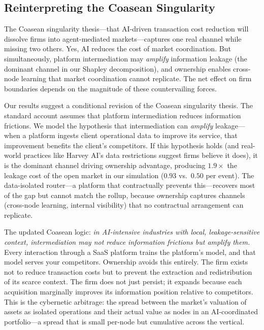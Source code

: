 \documentclass[12pt]{article}
\theoremstyle{definition}
\begin{document}
\subsection{Reinterpreting the Coasean Singularity}

The Coasean singularity thesis---that AI-driven transaction cost reduction will dissolve firms into agent-mediated markets---captures one real channel while missing two others. Yes, AI reduces the cost of market coordination. But simultaneously, platform intermediation may \textit{amplify} information leakage (the dominant channel in our Shapley decomposition), and ownership enables cross-node learning that market coordination cannot replicate. The net effect on firm boundaries depends on the magnitude of these countervailing forces.

Our results suggest a conditional revision of the Coasean singularity thesis. The standard account assumes that platform intermediation reduces information frictions. We model the hypothesis that intermediation can \textit{amplify} leakage---when a platform ingests client operational data to improve its service, that improvement benefits the client's competitors. If this hypothesis holds (and real-world practices like Harvey AI's data restrictions suggest firms believe it does), it is the dominant channel driving ownership advantage, producing $1.9\times$ the leakage cost of the open market in our simulation ($0.93$ vs.\ $0.50$ per event). The data-isolated router---a platform that contractually prevents this---recovers most of the gap but cannot match the rollup, because ownership captures channels (cross-node learning, internal visibility) that no contractual arrangement can replicate.

The updated Coasean logic: \textit{in AI-intensive industries with local, leakage-sensitive context, intermediation may not reduce information frictions but amplify them.} Every interaction through a SaaS platform trains the platform's model, and that model serves your competitors. Ownership avoids this entirely. The firm exists not to reduce transaction costs but to prevent the extraction and redistribution of its scarce context. The firm does not just persist; it expands because each acquisition marginally improves its information position relative to competitors. This is the cybernetic arbitrage: the spread between the market's valuation of assets as isolated operations and their actual value as nodes in an AI-coordinated portfolio---a spread that is small per-node but cumulative across the vertical.
\end{document}
